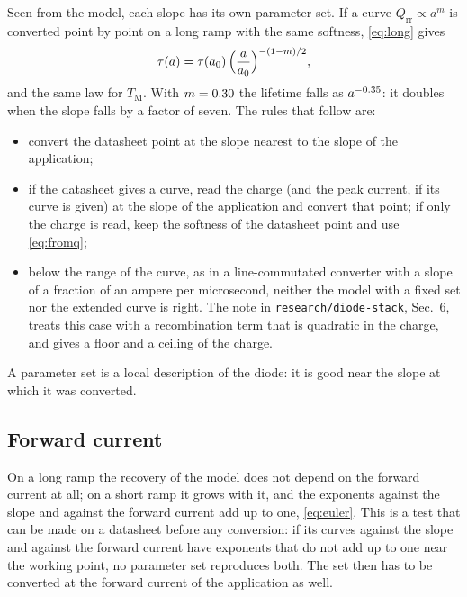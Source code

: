 \documentclass[10pt,a4paper]{scrartcl}
\newcommand{\Qrr}{Q_\mathrm{rr}}
\newcommand{\TM}{T_\mathrm{M}}
\begin{document}
Seen from the model, each slope has its own parameter set. If a curve $\Qrr \propto a^{m}$ is converted point by point on a long ramp with the same softness, \eqref{eq:long} gives
\begin{equation}
\tau(a) = \tau(a_0)\,\Bigl(\frac{a}{a_0}\Bigr)^{-(1-m)/2} ,
\label{eq:taucurve}
\end{equation}
and the same law for $\TM$. With $m = 0.30$ the lifetime falls as $a^{-0.35}$: it doubles when the slope falls by a factor of seven. The rules that follow are:
\begin{itemize}
\item convert the datasheet point at the slope nearest to the slope of the application;
\item if the datasheet gives a curve, read the charge (and the peak current, if its curve is given) at the slope of the application and convert that point; if only the charge is read, keep the softness of the datasheet point and use \eqref{eq:fromq};
\item below the range of the curve, as in a line-commutated converter with a slope of a fraction of an ampere per microsecond, neither the model with a fixed set nor the extended curve is right. The note in \texttt{research/diode-stack}, Sec.~6, treats this case with a recombination term that is quadratic in the charge, and gives a floor and a ceiling of the charge.
\end{itemize}
A parameter set is a local description of the diode: it is good near the slope at which it was converted.

\subsection{Forward current}
On a long ramp the recovery of the model does not depend on the forward current at all; on a short ramp it grows with it, and the exponents against the slope and against the forward current add up to one, \eqref{eq:euler}. This is a test that can be made on a datasheet before any conversion: if its curves against the slope and against the forward current have exponents that do not add up to one near the working point, no parameter set reproduces both. The set then has to be converted at the forward current of the application as well.
\end{document}
